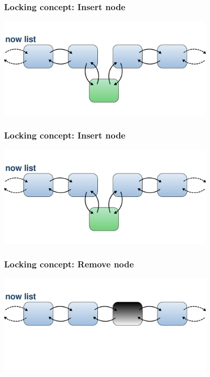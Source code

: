 \documentclass{beamer}
\begin{document}
\begin{frame}
\frametitle{Locking concept: Insert node}
\begin{center}
	\includegraphics[height=140pt]{insert5.pdf}
\end{center}
\end{frame}

\begin{frame}
\frametitle{Locking concept: Insert node}
\begin{center}
	\includegraphics[height=140pt]{insert6.pdf}
\end{center}
\end{frame}


\begin{frame}
\frametitle{Locking concept: Remove node}
\begin{center}
	\includegraphics[height=140pt]{remove1.pdf}
\end{center}
\end{frame}
\end{document}
